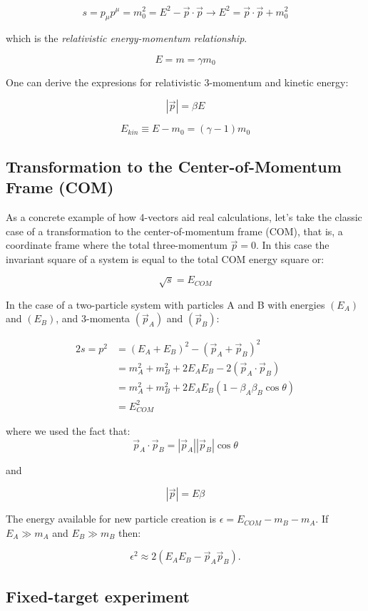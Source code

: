 \documentclass[
  letterpaper,
  DIV=11,
  numbers=noendperiod]{scrreprt}
\begin{document}
\[  s = p_\mu p^{\mu} = m_0^2 = E^2 -{\vec p\cdot \vec p} \rightarrow E^2 = {\vec p\cdot \vec p} +m_0^2\]

which is the \emph{relativistic energy-momentum relationship}.

\[ E = m = \gamma m_0\]

One can derive the expresions for relativistic 3-momentum and kinetic
energy:

\[|{\vec p}|= \beta E\]

\[E_{kin} \equiv E - m_0 = (\gamma -1) m_0\]

\subsection{Transformation to the Center-of-Momentum Frame
(COM)}\label{transformation-to-the-center-of-momentum-frame-com}

As a concrete example of how 4-vectors aid real calculations, let's take
the classic case of a transformation to the center-of-momentum frame
(COM), that is, a coordinate frame where the total three-momentum
\(\vec p = 0\). In this case the invariant square of a system is equal
to the total COM energy square or:

\[\sqrt{s} = E_{COM}\]

In the case of a two-particle system with particles A and B with
energies \((E_A)\) and \((E_B)\), and 3-momenta \((\vec{p}_A)\) and
\((\vec{p}_B)\):

\[\begin{aligned}{2}
s = p^2 &= (E_A + E_B)^2 - (\vec{p}_A + \vec{p}_B)^2 \\
    &= m_A^2 + m_B^2 + 2E_AE_B - 2(\vec{p}_A \cdot \vec{p}_B)\\
    &= m_A^2 + m_B^2 + 2E_AE_B( 1 - \beta_A\beta_B\cos \theta)\\
    &= E_{COM}^2
\end{aligned}\]

where we used the fact that:
\[\vec{p}_A \cdot \vec{p}_B = |\vec{p}_A ||\vec{p}_B|\cos\theta\]

and

\[ |\vec{p}| = E\beta \]

The energy available for new particle creation is
\(\epsilon = E_{COM} - m_B - m_A\). If \(E_A \gg m_A\) and
\(E_B \gg m_B\) then:

\[\epsilon^2 \approx 2 (E_A E_B - \vec{p}_A \vec{p}_B ).\]

\subsection{Fixed-target experiment}\label{fixed-target-experiment}
\end{document}
